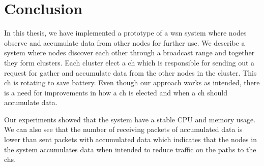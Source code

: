 \documentclass[USenglish]{uit-thesis}
\begin{document}




\chapter{Conclusion}
\glsresetall
In this thesis, we have implemented a prototype of a \gls{wsn} system where nodes observe and accumulate data from other nodes for further use. We describe a system where nodes discover each other through a broadcast range and together they form clusters. Each cluster elect  a \gls{ch} which is responsible for sending out a request for gather and accumulate data from the other nodes in the cluster. This \gls{ch} is rotating to save battery. Even though our approach works as intended, there is a need for improvements in how a \gls{ch} is elected and when a \gls{ch} should accumulate data.

Our experiments showed that the system have a stable CPU and memory usage. We can also see that the number of receiving packets of accumulated data is lower than sent packets with accumulated data which indicates that the nodes in the system accumulates data when intended to reduce traffic on the paths to the \glspl{ch}.
\end{document}
